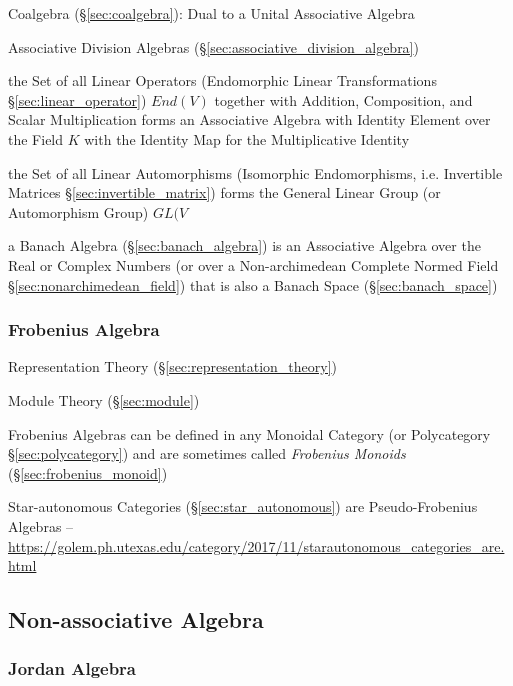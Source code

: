 {{Coalgebra (\S\ref{sec:coalgebra}): Dual to a Unital Associative
Algebra

\fist Associative Division Algebras (\S\ref{sec:associative_division_algebra})

the Set of all Linear Operators (Endomorphic Linear Transformations
\S\ref{sec:linear_operator}) $End(V)$ together with Addition, Composition, and
Scalar Multiplication forms an Associative Algebra with Identity Element over
the Field $K$ with the Identity Map for the Multiplicative Identity

\fist the Set of all Linear Automorphisms (Isomorphic Endomorphisms, i.e.
Invertible Matrices \S\ref{sec:invertible_matrix}) forms the General Linear
Group (or Automorphism Group) $GL(V$

a Banach Algebra (\S\ref{sec:banach_algebra}) is an Associative Algebra over
the Real or Complex Numbers (or over a Non-archimedean Complete Normed Field
\S\ref{sec:nonarchimedean_field}) that is also a Banach Space
(\S\ref{sec:banach_space})



\subsubsection{Frobenius Algebra}\label{sec:frobenius_algebra}

Representation Theory (\S\ref{sec:representation_theory})

Module Theory (\S\ref{sec:module})

Frobenius Algebras can be defined in any Monoidal Category (or
Polycategory \S\ref{sec:polycategory}) and are sometimes called
\emph{Frobenius Monoids} (\S\ref{sec:frobenius_monoid})

Star-autonomous Categories (\S\ref{sec:star_autonomous}) are Pseudo-Frobenius
Algebras
--\url{https://golem.ph.utexas.edu/category/2017/11/starautonomous_categories_are.html}



\subsection{Non-associative Algebra}
\label{sec:nonassociative_algebra}

\subsubsection{Jordan Algebra}\label{sec:jordan_algebra}

}}
